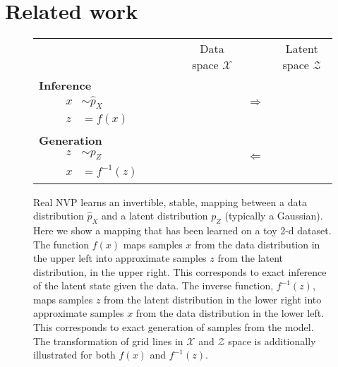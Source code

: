 \documentclass{article}
\def\X{{\mathcal{X}}}
\def\Z{{\mathcal{Z}}}
\begin{document}
\section{Related work}
\begin{figure}
\begin{center}
{\renewcommand{\arraystretch}{2}
\begin{tabular}{m{1.25in}ccc}
& Data space $\X$ & & Latent space $\Z$
\\
\parbox{1.25in}{
\textbf{Inference}
$\begin{aligned}
\qquad x &\sim \hat{p}_{X} &\\
\qquad z &= f\left(x\right)
\end{aligned}$
}
&
&
\parbox{.25in}{
$\begin{aligned}
\Rightarrow
\end{aligned}$
}
&
\\[0.5in] \parbox{1.25in}{
\textbf{Generation}
$\begin{aligned}
\qquad z &\sim p_{Z} &
\\
\qquad x &= f^{-1}\left(z\right)
\end{aligned}$
}
 &
&
\parbox{.25in}{
$\begin{aligned}
\Leftarrow
\end{aligned}$
}
&
\end{tabular}}
\end{center}
    \caption{Real NVP learns an invertible, stable, mapping between a data distribution $\hat{p}_{X}$ and a latent distribution $p_{Z}$ (typically a Gaussian).
    Here we show a mapping that has been learned on a toy 2-d dataset.
    The function $f\left(x\right)$ maps samples $x$ from the data distribution in the upper left into approximate samples $z$ from the latent distribution, in the upper right. This corresponds to exact inference of the latent state given the data.
    The inverse function, $f^{-1}\left(z\right)$, maps samples $z$ from the latent distribution in the lower right into approximate samples $x$ from the data distribution in the lower left. This corresponds to exact generation of samples from the model.
    The transformation of grid lines in $\X$ and $\Z$ space is additionally illustrated for both $f\left(x\right)$ and $f^{-1}\left(z\right)$.
}
    \label{fig:spaghetti}
\end{figure}
\end{document}
